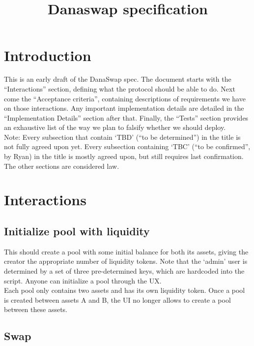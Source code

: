 \documentclass{article}
\title{Danaswap specification}
\begin{document}
\maketitle

\begingroup
  \hypersetup{hidelinks}
  \tableofcontents
\endgroup
\newpage

\section{Introduction}

This is an early draft of the DanaSwap spec. The document starts with the
``Interactions'' section, defining what the protocol should be able to do. Next
come the ``Acceptance criteria'', containing descriptions of requirements we
have on those interactions. Any important implementation details are detailed in
the ``Implementation Details'' section after that. Finally, the ``Tests''
section provides an exhaustive list of the way we plan to falsify whether we
should deploy.  \\

Note: Every subsection that contain `TBD' (``to be determined'') in the title is
not fully agreed upon yet. Every subsection containing `TBC' (``to be
confirmed'', by Ryan) in the title is mostly agreed upon, but still requires
last confirmation. The other sections are considered law.

\section{Interactions}

\subsection*{Initialize pool with liquidity}

This should create a pool with some initial balance for both its assets, giving
the creator the appropriate number of liquidity tokens. Note that the `admin'
user is determined by a set of three pre-determined keys, which are hardcoded
into the script. Anyone can initialize a pool through the UX. \\

Each pool only contains two assets and has its own liquidity token. Once a pool
is created between assets A and B, the UI no longer allows to create a pool
between these assets.

\subsection*{Swap}
\end{document}
